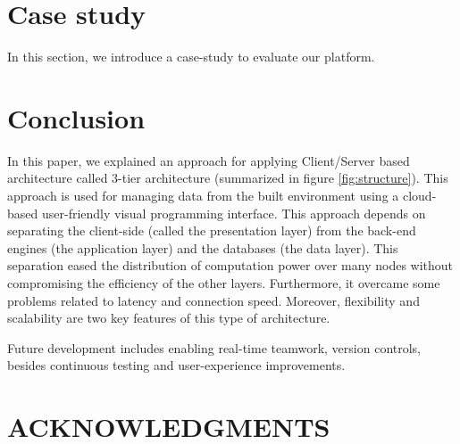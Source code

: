 \documentclass{scsSimAUDPaperFormat}
\begin{document}
\section{Case study} \label{section:casestudy}
In this section, we introduce a case-study to evaluate our platform. 

\section{Conclusion}
In this paper, we explained an approach for applying Client/Server based architecture called 3-tier architecture (summarized in figure \ref{fig:structure}). This approach is used for managing data from the built environment using a cloud-based user-friendly visual programming interface. This approach depends on separating the client-side (called the presentation layer) from the back-end engines (the application layer) and the databases (the data layer). This separation eased the distribution of computation power over many nodes without compromising the efficiency of the other layers. Furthermore, it overcame some problems related to latency and connection speed. Moreover, flexibility and scalability are two key features of this type of architecture. 

Future development includes enabling real-time teamwork, version controls, besides continuous testing and user-experience improvements. 

\section*{ACKNOWLEDGMENTS}
\clearpage
\balance






\end{document}
